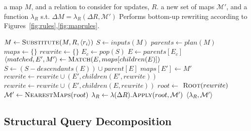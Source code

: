 \begin{algorithm}
\caption{$\rewrite(M,R)$}
\label{alg:rewrite}
\begin{codebox}
\zi {}
\zi \> a map $M$, and a relation to consider for updates, $R$.
\zi {}
\zi \> a new set of maps $\mathcal{M'}$, and a function $\lambda_R$ s.t.
\zi \>\> $\Delta M = \lambda_R(\Delta R,\mathcal{M'})$
\zi {}
\zi	\> Performs bottom-up rewriting according to
Figures~\ref{fig:rules},\ref{fig:maprules}.
\end{codebox}
\begin{algorithmic}[1]
\smallskip
\STATE $M \leftarrow \mbox{\sc Substitute}(M,R,{\langle r_i\rangle})$
\STATE $S \leftarrow inputs(M)$
\STATE $parents \leftarrow plan(M)$
\STATE $maps \leftarrow \{\}$
\STATE $rewrite \leftarrow \{\}$
	\STATE $E_{c} \leftarrow pop(S)$
	\STATE $E \leftarrow parents[E_{c}]$
	\STATE ${\langle matched,E',M'\rangle} \leftarrow \mbox{\sc Match}(E,maps[children(E)])$
		\STATE $S \leftarrow (S - descendants(E)) \cup parent[E]$
		\STATE $maps[E'] \leftarrow M'$
		\STATE $rewrite \leftarrow rewrite \cup (E',children(E',rewrite))$
	\ELSE
		\STATE $rewrite \leftarrow rewrite \cup (E',children(E,rewrite))$
	\ENDIF
\ENDWHILE
\STATE $root \leftarrow$ $\mbox{\sc Root}(rewrite)$
\STATE $\mathcal{M'} \leftarrow \mbox{\sc NearestMaps}(root)$
\STATE $\lambda_R \leftarrow \lambda(\Delta R).\mbox{\sc Apply}(root,\mathcal{M'})$
\RETURN ${\langle\lambda_R,\mathcal{M'}\rangle}$
\end{algorithmic}
\end{algorithm}

\subsection{Structural Query Decomposition}


